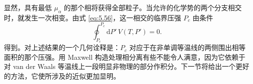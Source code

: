 
显然，具有最低 $\mu_\alpha$ 的那个相将获得全部粒子。当允许的化学势的两个分支相交时，就发生一次相变。由式 \eqref{eq:5.56}，这一相交的临界压强 $P_c$ 由条件
\begin{equation}\label{eq:5.57}
\oint_{P_c}^{P_c}\mathrm{d}P'\,V(T,P')=0.
\end{equation}
得到。对上述结果的一个几何诠释是：$P_c$ 对应于在非单调等温线的两侧围出相等面积的那个压强。用 Maxwell 构造处理相分离有些不能令人满意，因为它依赖于对 van der Waals 等温线上一段明显非物理的部分作积分。下一节将给出一个更好的方法，它使所涉及的近似更加显明。




